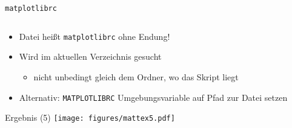 \begin{frame}[fragile]{\texttt{matplotlibrc}}
  \inputminted{text}{script/matplotlibrc}

  \begin{itemize}
    \item Datei heißt \texttt{matplotlibrc} ohne Endung!
    \item Wird im aktuellen Verzeichnis gesucht
      \begin{itemize}
        \item nicht unbedingt gleich dem Ordner, wo das Skript liegt
      \end{itemize}
    \item Alternativ: \texttt{MATPLOTLIBRC} Umgebungsvariable auf Pfad zur Datei setzen
  \end{itemize}
\end{frame}

\AddToShipoutPictureFG*{\ShowFramePicture}
\begin{frame}{Ergebnis (5)}
  \centering
  \texttt{[image: figures/mattex5.pdf]}
\end{frame}

